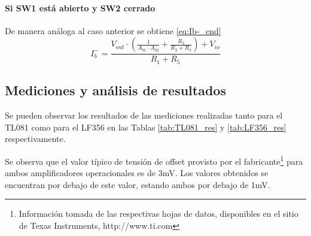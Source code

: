 \paragraph{Si SW1 est\'a abierto y SW2 cerrado}

De manera an\'aloga al caso anterior se obtiene \ref{eq:Ib-_end}
\begin{equation}
    I_b^- = \frac{ V_{out} \cdot \left(\frac{1}{A_{01} \cdot A_{02}} + \frac{R_2}{R_2+R_3}\right) + V_{io}}{R_1 + R_5}
    \label{eq:Ib-_end}
\end{equation}

\par

\subsection{Mediciones y an\'alisis de resultados}
Se pueden observar los resultados de las mediciones realizadas tanto para el TL081 como para el LF356 en las Tablas \ref{tab:TL081_res} y \ref{tab:LF356_res} respectivamente.
\begin{table}[H]
    \centering
    \caption{Resultados de las mediciones realizadas para el TL081}
    \label{tab:TL081_res}
\end{table}


\begin{table}[H]
\centering
{}
\caption{\label{tab:LF356_res} Resultados de las mediciones realizadas para el LF356}
\end{table}
Se observa que el valor t\'ipico de tensi\'on de offset provisto por el fabricante\footnote{Informaci\'on tomada de las respectivas hojas de datos, disponibles en el sitio de Texas Instruments, http://www.ti.com} para ambos amplificadores operacionales es de 3mV. Los valores obtenidos se encuentran por debajo de este valor, estando ambos por debajo de 1mV.


